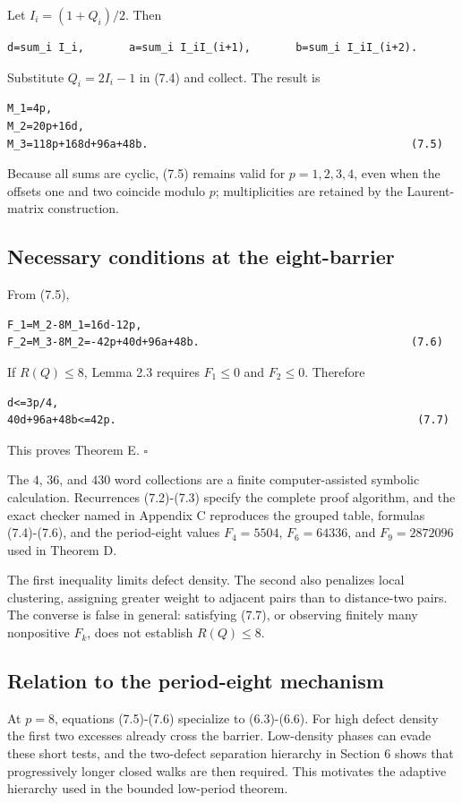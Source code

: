 Let \(I_i=(1+Q_i)/2\). Then

\begin{lstlisting}[language={}]
d=sum_i I_i,       a=sum_i I_iI_(i+1),       b=sum_i I_iI_(i+2).
\end{lstlisting}

Substitute \(Q_i=2I_i-1\) in (7.4) and collect. The result is

\begin{lstlisting}[language={}]
M_1=4p,
M_2=20p+16d,
M_3=118p+168d+96a+48b.                                         (7.5)
\end{lstlisting}

Because all sums are cyclic, (7.5) remains valid for \(p=1,2,3,4\), even when
the offsets one and two coincide modulo \(p\); multiplicities are retained by
the Laurent-matrix construction.

\subsection{Necessary conditions at the eight-barrier}

From (7.5),

\begin{lstlisting}[language={}]
F_1=M_2-8M_1=16d-12p,
F_2=M_3-8M_2=-42p+40d+96a+48b.                                 (7.6)
\end{lstlisting}

If \(R(Q)\le 8\), Lemma 2.3 requires \(F_1\le 0\) and \(F_2\le 0\). Therefore

\begin{lstlisting}[language={}]
d<=3p/4,
40d+96a+48b<=42p.                                               (7.7)
\end{lstlisting}

This proves Theorem E. \(\square\)

The \(4\), \(36\), and \(430\) word collections are a finite computer-assisted
symbolic calculation. Recurrences (7.2)-(7.3) specify the complete proof
algorithm, and the exact checker named in Appendix C reproduces the grouped
table, formulas (7.4)-(7.6), and the period-eight values
\(F_4=5504\), \(F_6=64336\), and \(F_9=2872096\) used in Theorem D.

The first inequality limits defect density. The second also penalizes local
clustering, assigning greater weight to adjacent pairs than to distance-two
pairs. The converse is false in general: satisfying (7.7), or observing
finitely many nonpositive \(F_k\), does not establish \(R(Q)\le 8\).

\subsection{Relation to the period-eight mechanism}

At \(p=8\), equations (7.5)-(7.6) specialize to (6.3)-(6.6). For high defect
density the first two excesses already cross the barrier. Low-density phases
can evade these short tests, and the two-defect separation hierarchy in
Section 6 shows that progressively longer closed walks are then required.
This motivates the adaptive hierarchy used in the bounded low-period theorem.
